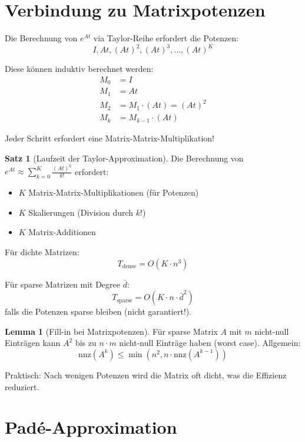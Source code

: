 \documentclass[a4paper,12pt]{report}
\theoremstyle{definition}
\newtheorem{satz}{Satz}
\newtheorem{lemma}{Lemma}
\begin{document}
	\section{Verbindung zu Matrixpotenzen}
	
	Die Berechnung von $e^{At}$ via Taylor-Reihe erfordert die Potenzen:
	\[
	I, At, (At)^2, (At)^3, \ldots, (At)^K
	\]
	
	Diese können induktiv berechnet werden:
	\begin{align}
		M_0 &= I \\
		M_1 &= At \\
		M_2 &= M_1 \cdot (At) = (At)^2 \\
		M_k &= M_{k-1} \cdot (At)
	\end{align}
	
	Jeder Schritt erfordert eine Matrix-Matrix-Multiplikation!
	
	\begin{satz}[Laufzeit der Taylor-Approximation]
		Die Berechnung von $e^{At} \approx \sum_{k=0}^K \frac{(At)^k}{k!}$ erfordert:
		\begin{itemize}
			\item $K$ Matrix-Matrix-Multiplikationen (für Potenzen)
			\item $K$ Skalierungen (Division durch $k!$)
			\item $K$ Matrix-Additionen
		\end{itemize}
		
		Für dichte Matrizen:
		\[
		T_{\text{dense}} = O(K \cdot n^3)
		\]
		
		Für sparse Matrizen mit Degree $\bar{d}$:
		\[
		T_{\text{sparse}} = O(K \cdot n \cdot \bar{d}^2)
		\]
		falls die Potenzen sparse bleiben (nicht garantiert!).
	\end{satz}
	
	\begin{lemma}[Fill-in bei Matrixpotenzen]
		Für sparse Matrix $A$ mit $m$ nicht-null Einträgen kann $A^2$ bis zu $n \cdot m$ nicht-null Einträge haben (worst case). Allgemein:
		\[
		\text{nnz}(A^k) \leq \min(n^2, n \cdot \text{nnz}(A^{k-1}))
		\]
		
		Praktisch: Nach wenigen Potenzen wird die Matrix oft dicht, was die Effizienz reduziert.
	\end{lemma}
	
	\section{Padé-Approximation}
	
\end{document}

